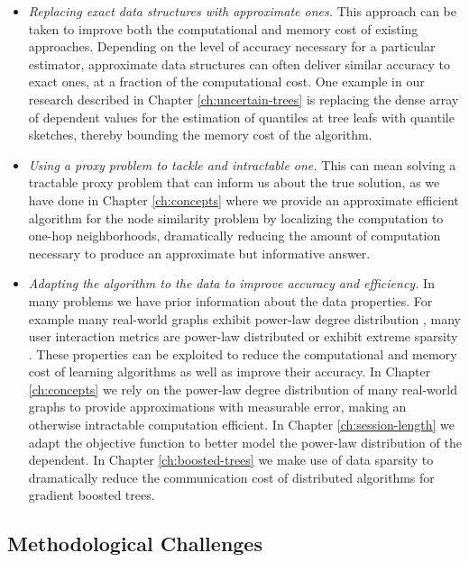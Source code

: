 \begin{itemize}
	\item \emph{Replacing exact data structures with approximate ones.} This approach can be taken
	to improve both the computational and memory cost of existing approaches. Depending on the
	level of accuracy necessary for a particular estimator, approximate data structures
	can often deliver similar accuracy to exact ones, at a fraction of the computational cost.
	One example in our research described in Chapter \ref{ch:uncertain-trees} is replacing the dense array of dependent values for the
	estimation of quantiles at tree leafs with quantile sketches, thereby bounding the
	memory cost of the algorithm.
	\item \emph{Using a proxy problem to tackle and intractable one.} This can mean solving a
	tractable proxy problem that can inform us about the true solution, as we have done
	in Chapter \ref{ch:concepts} where we provide an approximate efficient algorithm for the node similarity problem by localizing the computation to one-hop neighborhoods, dramatically reducing the
	amount of computation necessary to produce an approximate but informative answer.
	\item \emph{Adapting the algorithm to the data to improve accuracy and efficiency.} In many problems
	we have prior information about the data properties. For example many real-world graphs exhibit
	power-law degree distribution \cite{small-world, barabasi-small-world}, many user interaction metrics are power-law
	distributed \cite{phonecalls, faloutsos1999internet, click-stream-power-law} or exhibit extreme sparsity \cite{esl}. These properties can
	be exploited to reduce the computational and memory cost of learning algorithms as well as
	improve their accuracy. In Chapter \ref{ch:concepts} we rely on the power-law degree
	distribution of many real-world graphs to provide approximations with measurable error,
	making an otherwise intractable computation efficient. In Chapter \ref{ch:session-length}
	we adapt the objective function to better model the power-law distribution of the dependent.
	In Chapter \ref{ch:boosted-trees} we make use of data sparsity to dramatically reduce
	the communication cost of distributed algorithms for gradient boosted trees.
\end{itemize}

\subsection*{Methodological Challenges}

